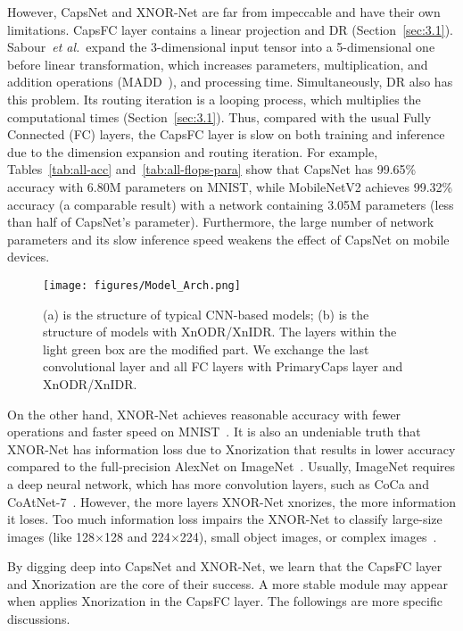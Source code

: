 \documentclass[sn-mathphys,iicol,Numbered]{sn-jnl}
\newcommand{\etal}{\textit{et al.}}
\begin{document}
However, CapsNet and XNOR-Net are far from impeccable and have their own limitations. CapsFC layer contains a linear projection and DR (Section~\ref{sec:3.1}). Sabour~\etal~expand the 3-dimensional input tensor into a 5-dimensional one before linear transformation, which increases parameters, multiplication, and addition operations (MADD~\cite{A18_MBV2}), and processing time. Simultaneously, DR also has this problem. Its routing iteration is a looping process, which multiplies the computational times (Section~\ref{sec:3.1}). Thus, compared with the usual Fully Connected (FC) layers, the CapsFC layer is slow on both training and inference due to the dimension expansion and routing iteration. For example, Tables~\ref{tab:all-acc} and~\ref{tab:all-flops-para} show that CapsNet has 99.65\% accuracy with 6.80M parameters on MNIST, while MobileNetV2 achieves 99.32\% accuracy (a comparable result) with a network containing 3.05M parameters (less than half of CapsNet's parameter). Furthermore, the large number of network parameters and its slow inference speed weakens the effect of CapsNet on mobile devices.

\begin{figure*}[t]
\begin{center}
\texttt{[image: figures/Model\_Arch.png]}
\end{center}
   \caption{(a) is the structure of typical CNN-based models; (b) is the structure of models with XnODR/XnIDR. The layers within the light green box are the modified part. We exchange the last convolutional layer and all FC layers with PrimaryCaps layer and XnODR/XnIDR.}
\label{fig:m-struct}
\end{figure*}



On the other hand, XNOR-Net achieves reasonable accuracy with fewer operations and faster speed on MNIST~\cite{A2_xnor}. It is also an undeniable truth that XNOR-Net has information loss due to Xnorization that results in lower accuracy compared to the full-precision AlexNet on ImageNet~\cite{A2_xnor, A48_img_net}. Usually, ImageNet requires a deep neural network, which has more convolution layers, such as CoCa and CoAtNet-7~\cite{A73_Coca, A72_CoAtNet}. However, the more layers XNOR-Net xnorizes, the more information it loses. Too much information loss impairs the XNOR-Net to classify large-size images (like 128$\times$128 and 224$\times$224), small object images, or complex images~\cite{A2_xnor}.

By digging deep into CapsNet and XNOR-Net, we learn that the CapsFC layer and Xnorization are the core of their success. A more stable module may appear when applies Xnorization in the CapsFC layer. The followings are more specific discussions.
\end{document}
